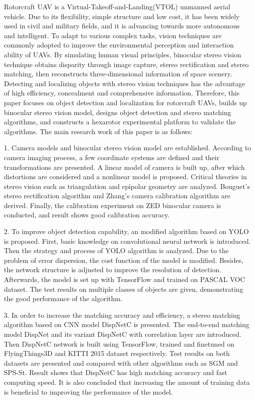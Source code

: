 \begin{Abstract}
Rotorcraft UAV is a Virtual-Takeoff-and-Landing(VTOL) unmanned aerial vehicle. Due to its flexibility, simple structure and low cost, it has been widely used in civil and military fields, and it is advancing towards more autonomous and intelligent. To adapt to various complex tasks, vision techniques are commonly adopted to improve the environmental perception and interaction ability of UAVs. By simulating human visual principles, binocular stereo vision technique obtains disparity through image capture, stereo rectification and stereo matching, then reconstructs three-dimensional information of space scenery. Detecting and localizing objects with stereo vision techniques has the advantage of high efficiency, concealment and comprehensive information. Therefore, this paper focuses on object detection and localization for rotorcraft UAVs, builds up binocular stereo vision model, designs object detection and stereo matching algorithms, and constructs a hexarotor experimental platform to validate the algorithms. The main research work of this paper is as follows:

1. Camera models and binocular stereo vision model are established. According to camera imaging process, a few coordinate systems are defined and their transformations are presented. A linear model of camera is built up, after which distortions are considered and a nonlinear model is proposed. Critical theories in stereo vision such as triangulation and epipolar geometry are analyzed. Bouguet's stereo rectification algorithm and Zhang's camera calibration algorithm are derived. Finally, the calibration experiment on ZED binocular camera is conducted, and result shows good calibration accuracy.

2. To improve object detection capability, an modified algorithm based on YOLO is proposed. First, basic knowledge on convolutional neural network is introduced. Then the strategy and process of YOLO algorithm is analyzed. Due to the problem of error dispersion, the cost function of the model is modified. Besides, the network structure is adjusted to improve the resolution of detection. Afterwards, the model is set up with TensorFlow and trained on PASCAL VOC dataset. The test results on multiple classes of objects are given, demonstrating the good performance of the algorithm.

3. In order to increase the matching accuracy and efficiency, a stereo matching algorithm based on CNN model DispNetC is presented. The end-to-end matching model DispNet and its variant DispNetC with correlation layer are introduced. Then DispNetC network is built using TensorFlow, trained and finetuned on FlyingThings3D and KITTI 2015 dataset respectively. Test results on both datasets are presented and compared with other algorithms such as SGM and SPS-St. Result shows that DispNetC has high matching accuracy and fast computing speed. It is also concluded that increasing the amount of training data is beneficial to improving the performance of the model.


\end{Abstract}
